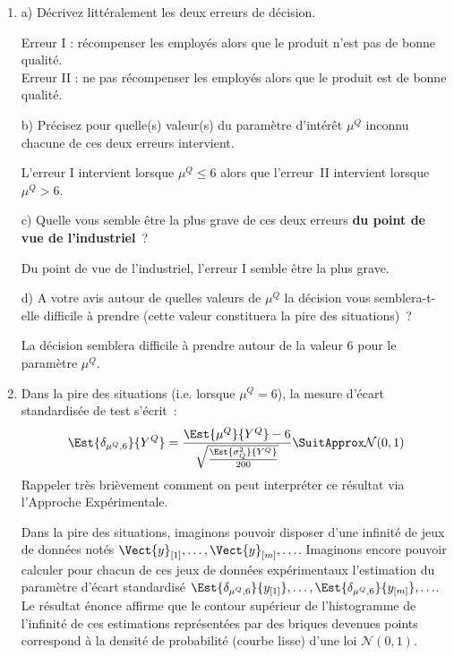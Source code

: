 \documentclass[10pt]{report}
\begin{document}
\begin{exercice}
\begin{enumerate}
 
\item a) D{\'e}crivez litt{\'e}ralement les deux erreurs de d{\'e}cision. 


\begin{Correction}
Erreur I : récompenser les employés alors que le produit n'est pas de bonne qualité. \\
Erreur II : ne pas récompenser les employés alors que le produit est de bonne qualité.
\end{Correction}


b) Pr{\'e}cisez pour quelle(s) valeur(s) du param{\`e}tre d'int{\'e}r{\^e}t $\mu^Q$ inconnu chacune de ces deux erreurs intervient. 


\begin{Correction}
L'erreur I intervient lorsque $\mu^Q\leq 6$ alors que l'erreur~II intervient lorsque $\mu^Q> 6$.
\end{Correction}


c) Quelle vous semble {\^e}tre la plus grave de ces deux erreurs \textbf{du point de vue de l'industriel}~? 


\begin{Correction}
Du point de vue de l'industriel, l'erreur I semble être la plus grave.
\end{Correction}



d) A votre avis autour de quelles valeurs de $\mu^Q$ la d{\'e}cision vous semblera-t-elle difficile {\`a} prendre (cette valeur constituera la pire des situations)~? 


\begin{Correction}
La décision semblera difficile à prendre autour de la valeur $6$ pour le paramètre $\mu^Q$.
\end{Correction}




\item Dans la pire des situations (i.e. lorsque $\mu^Q=6$), la mesure d'{\'e}cart standardis{\'e}e de test s'{\'e}crit~: 
$$
\Est{\delta_{\mu^Q,6}}{Y^Q} = \frac{ \Est{\mu^Q}{Y^Q} - 6 }{ \sqrt{ \frac{\Est{\sigma_Q^2}{Y^Q}}{200}}} \SuitApprox \mathcal{N}(0,1)
$$
Rappeler tr{\`e}s bri{\`e}vement comment on peut interpr{\'e}ter ce r{\'e}sultat via l'Approche Exp{\'e}rimentale. 


\begin{Correction}
Dans la pire des situations, imaginons pouvoir disposer d'une infinité de jeux de données notés $\Vect{y}_{[1]},\ldots,\Vect{y}_{[m]},\ldots$. Imaginons encore pouvoir calculer pour chacun de ces jeux de données expérimentaux l'estimation du paramètre d'écart standardisé $\Est{\delta_{\mu^Q,6}}{y_{[1]}}, \ldots, \Est{\delta_{\mu^Q,6}}{y_{[m]}},\ldots$. Le résultat énonce affirme que le contour supérieur de l'histogramme de l'infinité de ces estimations représentées par des briques devenues points correspond à la densité de probabilité (courbe lisse) d'une loi $\mathcal{N(0,1)}$. 
\end{Correction}




\end{enumerate}
\end{exercice}
\end{document}
